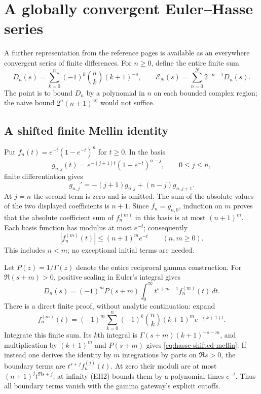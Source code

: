 \section{A globally convergent Euler--Hasse series}
\label{sec:hasse}

A further representation from the reference pages is available as an everywhere convergent series
of finite differences.  For $n\ge0$, define the entire finite sum
\[
 D_n(s)=\sum_{k=0}^n(-1)^k\binom nk(k+1)^{-s},\qquad
 \mathcal{E}_N(s)=\sum_{n=0}^N2^{-n-1}D_n(s).
\]
The point is to bound $D_n$ by a polynomial in $n$ on each bounded
complex region; the naive bound $2^n(n+1)^{|s|}$ would not suffice.

\subsection{A shifted finite Mellin identity}

Put $f_n(t)=e^{-t}(1-e^{-t})^n$ for $t\ge0$.  In the basis
\[
 g_{n,j}(t)=e^{-(j+1)t}(1-e^{-t})^{n-j},\qquad 0\le j\le n,
\]
finite differentiation gives
\[
 g_{n,j}'=-(j+1)g_{n,j}+(n-j)g_{n,j+1}.
 \tag{EH1}
\]
At $j=n$ the second term is zero and is omitted.  The sum of the
absolute values of the two displayed coefficients is $n+1$.
Since $f_n=g_{n,0}$, induction on $m$ proves that the absolute
coefficient sum of $f_n^{(m)}$ in this basis is at most $(n+1)^m$.
Each basis function has modulus at most $e^{-t}$; consequently
\[
 |f_n^{(m)}(t)|\le(n+1)^m e^{-t}\qquad(n,m\ge0).       \tag{EH2}
\]
This includes $n<m$; no exceptional initial terms are needed.

Let $P(z)=1/\Gamma(z)$ denote the entire reciprocal gamma construction.
For $\Re(s+m)>0$, positive scaling in Euler's integral gives
\begin{equation}
 \boxed{\displaystyle
 D_n(s)=(-1)^m P(s+m)
       \int_0^\infty t^{s+m-1}f_n^{(m)}(t)\,dt.}
 \label{eq:hasse-shifted-mellin}
\end{equation}
There is a direct finite proof, without analytic continuation: expand
\[
 f_n^{(m)}(t)=(-1)^m\sum_{k=0}^n
            (-1)^k\binom nk(k+1)^m e^{-(k+1)t}.
\]
Integrate this finite sum.  Its $k$th integral is
$\Gamma(s+m)(k+1)^{-s-m}$, and multiplication by $(k+1)^m$ and
$P(s+m)$ gives \eqref{eq:hasse-shifted-mellin}.
If instead one derives the identity by $m$ integrations by parts on
$\Re s>0$, the boundary terms are $t^{s+j}f_n^{(j)}(t)$.
At zero their moduli are at most $(n+1)^j t^{\Re s+j}$; at infinity
(EH2) bounds them by a polynomial times $e^{-t}$.  Thus all boundary
terms vanish with the gamma gateway's explicit cutoffs.

